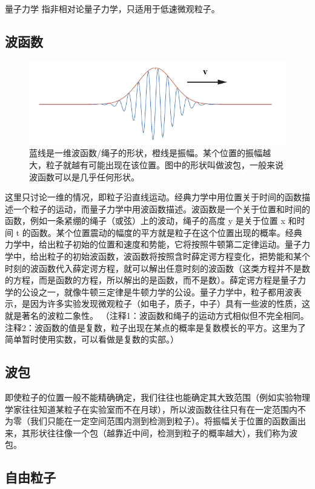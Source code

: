 ﻿量子力学
指非相对论量子力学，只适用于低速微观粒子。

\subsection{波函数}

\begin{figure}[ht]
\centering
\includegraphics[width=12cm]{./figures/QM01.pdf}
\caption{蓝线是一维波函数/绳子的形状，橙线是振幅。某个位置的振幅越大，粒子就越有可能出现在该位置。图中的形状叫做波包，一般来说波函数可以是几乎任何形状。} \label{QM0_fig1}
\end{figure}

这里只讨论一维的情况，即粒子沿直线运动。经典力学中用位置关于时间的函数描述一个粒子的运动，而量子力学中用波函数描述。波函数是一个关于位置和时间的函数，例如一条紧绷的绳子（或弦）上的波动，绳子的高度 y 是关于位置 x 和时间 t 的函数。某个位置震动的幅度的平方就是粒子在这个位置出现的概率。经典力学中，给出粒子初始的位置和速度和势能，它将按照牛顿第二定律运动。量子力学中，给出粒子的初始波函数，波函数将按照含时薛定谔方程变化，把势能和某个时刻的波函数代入薛定谔方程，就可以解出任意时刻的波函数（这类方程并不是数的方程，而是函数的方程，所以解出的是函数，而不是数）。薛定谔方程是量子力学的公设之一，就像牛顿三定律是牛顿力学的公设。量子力学中，粒子都用波表示，是因为许多实验发现微观粒子（如电子，质子，中子）具有一些波的性质，这就是著名的波粒二象性。
（注释1：波函数和绳子的运动方式相似但不完全相同。注释2：波函数的值是复数，粒子出现在某点的概率是复数模长的平方。这里为了简单暂时使用实数，可以看做是复数的实部。）

\subsection{波包}
即使粒子的位置一般不能精确确定，我们往往也能确定其大致范围（例如实验物理学家往往知道某粒子在实验室而不在月球），所以波函数往往只有在一定范围内不为零（我们只能在一定空间范围内测到检测到粒子）。将振幅关于位置的函数画出来，其形状往往像一个包（越靠近中间，检测到粒子的概率越大），我们称为波包。

\subsection{自由粒子}

